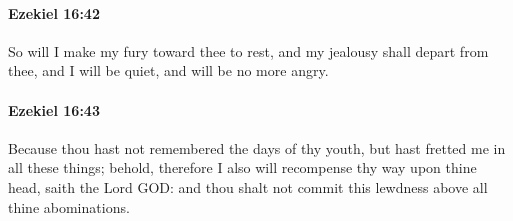 		\paragraph{Ezekiel 16:42} %
			\label{EZEKIEL-16-42}

			So will I make my fury toward thee to rest, and my jealousy shall depart from thee, and I will be quiet, and will be no more angry.


		\paragraph{Ezekiel 16:43} %
			\label{EZEKIEL-16-43}

			Because thou hast not remembered the days of thy youth, but hast fretted me in all these things; behold, therefore I also will recompense thy way upon thine head, saith the Lord GOD: and thou shalt not commit this lewdness above all thine abominations.

